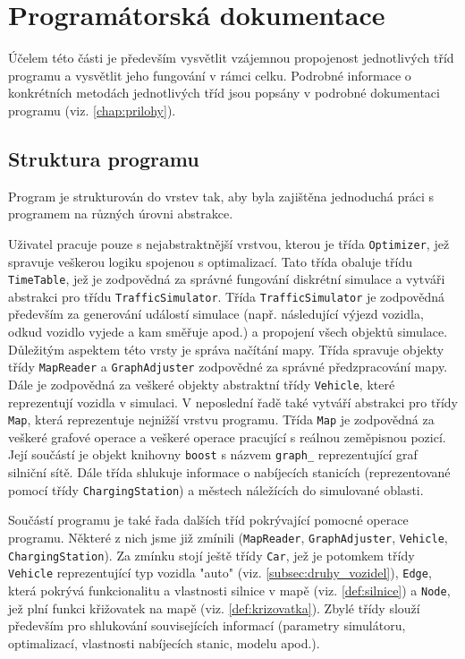 \chapter{Programátorská dokumentace}
\label{chap:prog_dok}

Účelem této části je především vysvětlit vzájemnou propojenost jednotlivých
tříd programu a vysvětlit jeho fungování v rámci celku. Podrobné informace o
konkrétních metodách jednotlivých tříd jsou popsány v podrobné dokumentaci
programu (viz. \cref{chap:prilohy}).


\section{Struktura programu}
Program je strukturován do vrstev tak, aby byla zajištěna jednoduchá práci s programem
na různých úrovni abstrakce. 

Uživatel pracuje pouze s nejabstraktnější vrstvou,
kterou je třída \texttt{Optimizer}, jež spravuje veškerou logiku spojenou s optimalizací.
Tato třída obaluje třídu \texttt{TimeTable}, jež je zodpovědná za správné fungování
diskrétní simulace a vytváři abstrakci pro třídu \texttt{TrafficSimulator}. Třída
\texttt{TrafficSimulator} je zodpovědná především za generování
událostí simulace (např. následující výjezd vozidla, odkud vozidlo vyjede a 
kam směřuje apod.) a propojení všech objektů simulace. Důležitým aspektem této 
vrsty je správa načítání mapy. Třída spravuje objekty třídy \texttt{MapReader}
a \texttt{GraphAdjuster} zodpovědné za správné předzpracování mapy. Dále je zodpovědná
za veškeré objekty abstraktní třídy \texttt{Vehicle}, které reprezentují vozidla v 
simulaci. V neposlední řadě také vytváří abstrakci pro třídy \texttt{Map}, která 
reprezentuje nejnižší vrstvu programu. Třída
\texttt{Map} je zodpovědná za veškeré grafové operace a veškeré operace pracující s 
reálnou zeměpisnou pozicí. Její součástí je objekt knihovny \texttt{boost}
s názvem \texttt{graph\_} reprezentující graf silniční sítě. Dále třída shlukuje 
informace o nabíjecích stanicích (reprezentované pomocí třídy \texttt{ChargingStation})
a městech náležících do simulované oblasti. 

Součástí programu je také řada dalších tříd pokrývající pomocné operace programu.
Některé z nich jsme již zmínili (\texttt{MapReader}, \texttt{GraphAdjuster}, 
\texttt{Vehicle}, 
\texttt{ChargingStation}). Za zmínku stojí ještě třídy \texttt{Car}, jež je potomkem třídy
\texttt{Vehicle} reprezentující typ vozidla "auto" (viz. \cref{subsec:druhy_vozidel}),
\texttt{Edge}, která pokrývá funkcionalitu a vlastnosti silnice v mapě (viz. \cref{def:silnice})
a \texttt{Node}, jež plní funkci křižovatek na mapě (viz. \cref{def:krizovatka}).
Zbylé třídy slouží především pro shlukování souvisejících informací 
(parametry simulátoru, optimalizací, vlastnosti nabíjecích stanic, modelu apod.).

